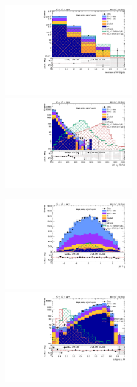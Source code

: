 \begin{figure}[!htb]
  \begin{center}
    \includegraphics[width=0.495\textwidth]{plots/v9_thesis/XVZnnhpSR/nFatJets.pdf}  
    \includegraphics[width=0.495\textwidth]{plots/v9_thesis/XVZnnhpSR/FatJet1_pt.pdf}
    
    \includegraphics[width=0.495\textwidth]{plots/v9_thesis/XVZnnhpSR/FatJet1_eta.pdf}
    \includegraphics[width=0.495\textwidth]{plots/v9_thesis/XVZnnhpSR/FatJet1_dR.pdf}


\end{center}
\end{figure}
